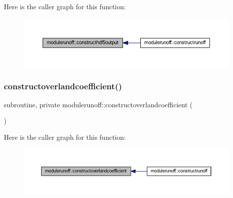 Here is the caller graph for this function\+:
\nopagebreak
\begin{figure}[H]
\begin{center}
\leavevmode
\includegraphics[width=350pt]{namespacemodulerunoff_a2cafb8c9efc342200a6ec558a7eeb90d_icgraph}
\end{center}
\end{figure}
\mbox{\label{namespacemodulerunoff_a9750562ffa96a2b097ee6cfb440440ec}} 
\subsubsection{\texorpdfstring{constructoverlandcoefficient()}{constructoverlandcoefficient()}}
{\footnotesize\ttfamily subroutine, private modulerunoff\+::constructoverlandcoefficient (\begin{DoxyParamCaption}{ }\end{DoxyParamCaption})\hspace{0.3cm}{\ttfamily [private]}}

Here is the caller graph for this function\+:
\nopagebreak
\begin{figure}[H]
\begin{center}
\leavevmode
\includegraphics[width=350pt]{namespacemodulerunoff_a9750562ffa96a2b097ee6cfb440440ec_icgraph}
\end{center}
\end{figure}
\mbox{\label{namespacemodulerunoff_afd5b620864c9f62a5b0258956c609766}} 
